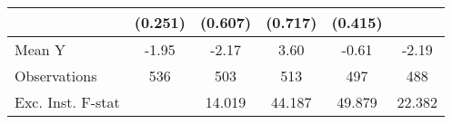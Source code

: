 {\begin{tabular}{l*{5}{c}}
            &     (0.251)         &     (0.607)         &     (0.717)         &     (0.415)         &                     \\
\midrule
Mean Y      &       -1.95         &       -2.17         &        3.60         &       -0.61         &       -2.19         \\
Observations&         536         &         503         &         513         &         497         &         488         \\
Exc. Inst. F-stat&                     &      14.019         &      44.187         &      49.879         &      22.382         \\
\bottomrule
\end{tabular}
}
